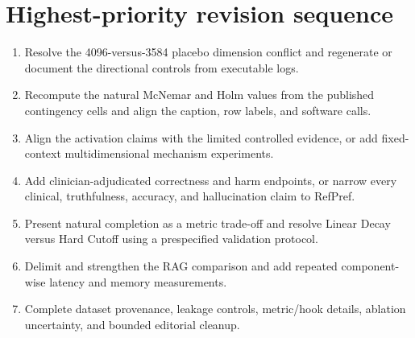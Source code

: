 \documentclass[11pt]{article}
\begin{document}
\section*{Highest-priority revision sequence}

\begin{enumerate}
    \item Resolve the 4096-versus-3584 placebo dimension conflict and regenerate or document the directional controls from executable logs.
    \item Recompute the natural McNemar and Holm values from the published contingency cells and align the caption, row labels, and software calls.
    \item Align the activation claims with the limited controlled evidence, or add fixed-context multidimensional mechanism experiments.
    \item Add clinician-adjudicated correctness and harm endpoints, or narrow every clinical, truthfulness, accuracy, and hallucination claim to RefPref.
    \item Present natural completion as a metric trade-off and resolve Linear Decay versus Hard Cutoff using a prespecified validation protocol.
    \item Delimit and strengthen the RAG comparison and add repeated component-wise latency and memory measurements.
    \item Complete dataset provenance, leakage controls, metric/hook details, ablation uncertainty, and bounded editorial cleanup.
\end{enumerate}
\end{document}
